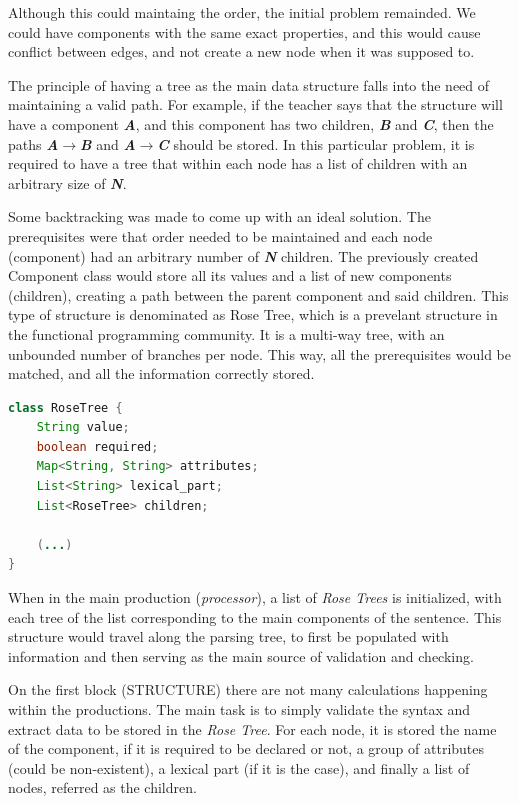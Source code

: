Although this could maintaing the order, the initial problem remainded. We could have components with the same exact properties, and this would cause conflict between
edges, and not create a new node when it was supposed to.

The principle of having a tree as the main data structure falls into the need of maintaining a valid path. For example, if the teacher says that the structure will have a component \emph{\textbf{A}}, and this component has two children, \emph{\textbf{B}} and \emph{\textbf{C}}, then the paths \emph{\textbf{A$\rightarrow$B}} and \emph{\textbf{A$\rightarrow$C}} should be stored. In this particular problem, it is required to have a tree that within each node has a list of children with an arbitrary size of \emph{\textbf{N}}.

Some backtracking was made to come up with an ideal solution. The prerequisites were that order needed to be maintained and each node (component) had an arbitrary number
of \emph{\textbf{N}} children. The previously created Component class would store all its values and a list of new components (children), creating a path between 
the parent component and said children. This type of structure is denominated as Rose Tree, which is a prevelant structure in the functional programming community. 
It is a multi-way tree, with an unbounded number of branches per node. This way, all the prerequisites would be matched, and all the information correctly stored. 

\begin{center}
\begin{minipage}{9cm}
\begin{lstlisting}[language=java, basicstyle=\small, label={lst:rosetree_class}, caption=RoseTree class]
class RoseTree {
    String value;
    boolean required;
    Map<String, String> attributes;
    List<String> lexical_part;
    List<RoseTree> children;

    (...)
}
\end{lstlisting}
\end{minipage}
\end{center}

When in the main production (\emph{processor}), a list of \emph{Rose Trees} is initialized, with each tree of the list corresponding to the main components of the sentence. This structure would travel along the parsing tree, to first be populated with information and then serving as the main source of validation and checking.

On the first block (STRUCTURE) there are not many calculations happening within the productions. 
The main task is to simply validate the syntax and extract data to be stored in the \emph{Rose Tree}. 
For each node, it is stored the name of the component, if it is required to be declared or not, a group of attributes (could be non-existent), 
a lexical part (if it is the case), and finally a list of nodes, referred as the children.

